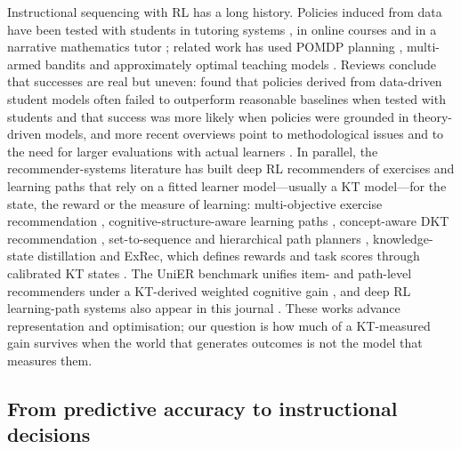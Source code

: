 Instructional sequencing with RL has a long history. Policies induced from data have been tested with students in tutoring systems \citep{chi2011umuai,shen2018jedm,zhou2022hrl}, in online courses \citep{bassen2020chi} and in a narrative mathematics tutor \citep{ruan2024rltutor}; related work has used POMDP planning \citep{rafferty2016pomdp}, multi-armed bandits \citep{clement2015bandits} and approximately optimal teaching models \citep{whitehill2018teaching}. Reviews conclude that successes are real but uneven: \citet{doroudi2019reward} found that policies derived from data-driven student models often failed to outperform reasonable baselines when tested with students and that success was more likely when policies were grounded in theory-driven models, and more recent overviews point to methodological issues and to the need for larger evaluations with actual learners \citep{singla2021rleducation,riedmann2025rlreview}. In parallel, the recommender-systems literature has built deep RL recommenders of exercises and learning paths that rely on a fitted learner model---usually a KT model---for the state, the reward or the measure of learning: multi-objective exercise recommendation \citep{huang2019dre}, cognitive-structure-aware learning paths \citep{liu2019cseal}, concept-aware DKT recommendation \citep{ai2019cdkt}, set-to-sequence and hierarchical path planners \citep{chen2023src,li2023gehrl}, knowledge-state distillation \citep{li2024pksd} and ExRec, which defines rewards and task scores through calibrated KT states \citep{ozyurt2025exrec}. The UniER benchmark unifies item- and path-level recommenders under a KT-derived weighted cognitive gain \citep{cheng2026unier}, and deep RL learning-path systems also appear in this journal \citep{ruan2025adaptive}. These works advance representation and optimisation; our question is how much of a KT-measured gain survives when the world that generates outcomes is not the model that measures them.

\subsection{From predictive accuracy to instructional decisions}

